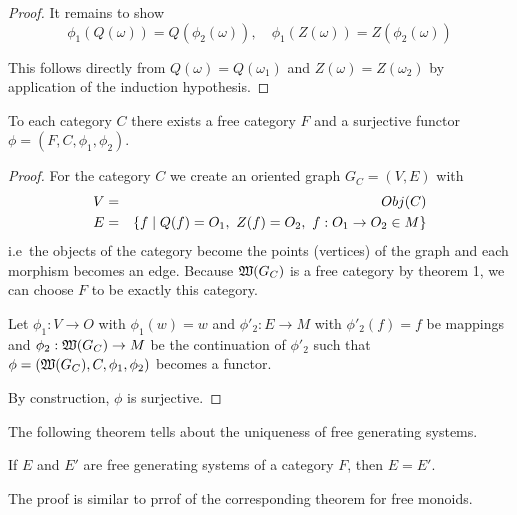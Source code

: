 \begin{proof}
It remains to show 
\[ \phi_1(Q(\omega)) = Q(\phi_2(\omega)),\quad \phi_1(Z(\omega)) =
Z(\phi_2(\omega)) \]

This follows directly from $Q(\omega) = Q(\omega_1)$ and $Z(\omega) =
Z(\omega_2)$ by application of the induction hypothesis.
\end{proof}

\bigskip
\begin{theorem}
To each category $C$ there exists a free category $F$ and a surjective functor
$\phi = (F, C, \phi_1, \phi_2)$.
\end{theorem}

\begin{proof}
For the category $C$ we create an oriented graph $G_C = (V, E)$ with 
\begin{eqnarray*}
V &=& Obj(C) \\
E &=& \mbox{$\{f \mid Q(f) = O_1,\ Z(f) = O_2,\ f : O_1 \to O_2 \in M\}$}
\end{eqnarray*}
i.e\ the objects of the category become the points (vertices) of the graph and
each morphism becomes an edge. Because $\mbox{$\mathfrak{W}(G_C)$}$ is a free category by
theorem 1, we can choose $F$ to be exactly this category.

Let $\phi_1 : V \to O$ with $\phi_1(w) = w$ and $\phi'_2 : E \to M$ with
$\phi'_2(f) = f$ be mappings and $\phi_2 : \mbox{$\mathfrak{W}(G_C)$} \to M$ be the
continuation of $\phi'_2$ such that $\phi = (\mbox{$\mathfrak{W}(G_C)$}, C, \phi_1, \phi_2)$
becomes a functor.

By construction, $\phi$ is surjective.
\end{proof}

\bigskip
The following theorem tells about the uniqueness of free generating systems.
\begin{theorem}
If $E$ and $E'$ are free generating systems of a category $F$, then $E = E'$.
\end{theorem}

The proof is similar to prrof of the corresponding theorem for free monoids.
